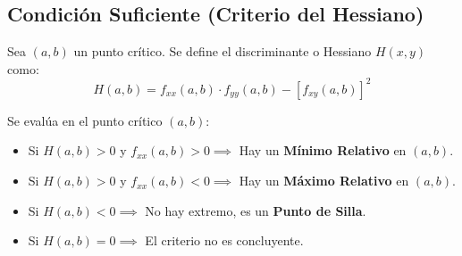 \documentclass[a4paper,12pt]{article}
\begin{document}
\subsection{Condición Suficiente (Criterio del Hessiano)}
Sea $(a,b)$ un punto crítico. Se define el discriminante o Hessiano $H(x,y)$ como:
$$ H(a,b) = f_{xx}(a,b) \cdot f_{yy}(a,b) - [f_{xy}(a,b)]^2 $$

Se evalúa en el punto crítico $(a,b)$:
\begin{itemize}
    \item Si $H(a,b) > 0$ y $f_{xx}(a,b) > 0 \implies$ Hay un \textbf{Mínimo Relativo} en $(a,b)$.
    \item Si $H(a,b) > 0$ y $f_{xx}(a,b) < 0 \implies$ Hay un \textbf{Máximo Relativo} en $(a,b)$.
    \item Si $H(a,b) < 0 \implies$ No hay extremo, es un \textbf{Punto de Silla}.
    \item Si $H(a,b) = 0 \implies$ El criterio no es concluyente.
\end{itemize}
\end{document}
